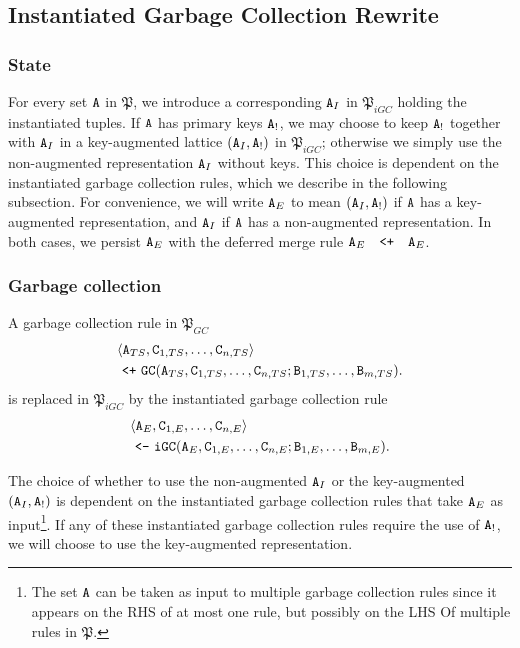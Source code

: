 \subsection{Instantiated Garbage Collection Rewrite}

\subsubsection{State}
For every set $\tt{A}$ in $\mathfrak{P}$, we introduce a corresponding $\tt{A}_I$ in $\mathfrak{P}_{iGC}$ holding the instantiated tuples.
If $\tt{A}$ has primary keys $\tt{A}_!$, we may choose to keep $\tt{A}_!$ together with $\tt{A}_I$ in a key-augmented lattice $(\tt{A}_I, \tt{A}_!)$ in $\mathfrak{P}_{iGC}$;
otherwise we simply use the non-augmented representation $\tt{A}_I$ without keys.
This choice is dependent on the instantiated garbage collection rules, which we describe in the following subsection.
For convenience, we will write $\tt{A}_E$ to mean $(\tt{A}_I, \tt{A}_!)$ if $\tt{A}$ has a key-augmented representation, and $\tt{A}_I$ if $\tt{A}$ has a non-augmented representation.
In both cases, we persist $\tt{A}_E$ with the deferred merge rule
$\tt{A}_E \quad\tt{<+}\quad \tt{A}_E$.


\subsubsection{Garbage collection}
A garbage collection rule in $\mathfrak{P}_{GC}$
\begin{align*}
&\langle \tt{A}_{TS}, \tt{C}_{1,TS}, \dots, \tt{C}_{n,TS} \rangle\\
&~\tt{<+}~
\tt{GC}(\tt{A}_{TS}, \tt{C}_{1,TS}, \dots, \tt{C}_{n,TS}; \tt{B}_{1,TS}, \dots, \tt{B}_{m,TS}).
\end{align*}
is replaced in $\mathfrak{P}_{iGC}$ by the instantiated garbage collection rule
\begin{align*}
&\langle \tt{A}_E, \tt{C}_{1,E}, \dots, \tt{C}_{n,E} \rangle\\
&~\tt{<-}~
\tt{iGC}(\tt{A}_E, \tt{C}_{1,E}, \dots, \tt{C}_{n,E}; \tt{B}_{1,E}, \dots, \tt{B}_{m,E}).
\end{align*}

The choice of whether to use the non-augmented $\tt{A}_I$ or the key-augmented $(\tt{A}_I, \tt{A}_!)$ is dependent on the instantiated garbage collection rules that take $\tt{A}_E$ as input\footnote{
	The set $\tt{A}$ can be taken as input to multiple garbage collection rules since it appears on the RHS of at most one rule, but possibly on the LHS Of multiple rules in $\mathfrak{P}$.
}.
If any of these instantiated garbage collection rules require the use of $\tt{A}_!$, we will choose to use the key-augmented representation.

